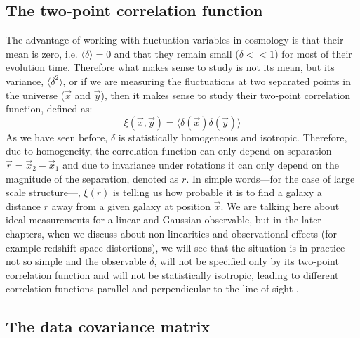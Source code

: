 \subsection{The two-point correlation function}

The advantage of working with fluctuation variables in cosmology is that their mean is zero, i.e. $\langle \delta \rangle = 0$ 
and that they remain small ($\delta<<1$) for most of their evolution time.
Therefore what makes sense to study  is not its mean, but its variance, $\langle \delta^2 \rangle$, or if 
we are measuring the fluctuations at two separated points in the universe ($\vec{x}$ and $\vec{y}$),
then it makes sense to study their two-point correlation function, defined as:
\begin{equation} \label{eq:correlationfunct}
\xi(\vec{x} ,\vec{y}) = \langle \delta (\vec{x})  \delta (\vec{y}) \rangle
\end{equation}
As we have seen before, $\delta$ is statistically homogeneous and isotropic. Therefore, due to homogeneity, the correlation
function can only depend on separation $\vec r = \vec{x}_2 - \vec{x}_1 $ and due to invariance under 
rotations it can only depend on the magnitude of the separation, denoted as $r$.
In simple words---for the case of large scale structure---, $\xi(r)$ is telling us how probable it is to find
a galaxy a distance $r$ away from a given galaxy at position $\vec x$.
We are talking here about ideal measurements for a linear and Gaussian observable, but in the later chapters, when we discuss
about non-linearities and observational effects (for example redshift space distortions), we will see that the situation is in practice not so simple and 
the observable $\delta$, will not be specified only by its 
two-point correlation function and will not be statistically isotropic, leading to different correlation
functions parallel and perpendicular to the line of sight \cite{(cite some BAO stuff)}.

\subsection{The data covariance matrix}

